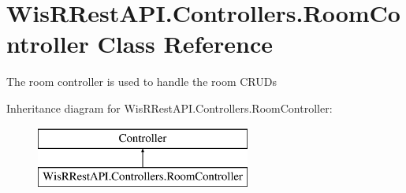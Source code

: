 \hypertarget{class_wis_r_rest_a_p_i_1_1_controllers_1_1_room_controller}{}\section{Wis\+R\+Rest\+A\+P\+I.\+Controllers.\+Room\+Controller Class Reference}
\label{class_wis_r_rest_a_p_i_1_1_controllers_1_1_room_controller}


The room controller is used to handle the room C\+R\+U\+D\textquotesingle{}s  


Inheritance diagram for Wis\+R\+Rest\+A\+P\+I.\+Controllers.\+Room\+Controller\+:\begin{figure}[H]
\begin{center}
\leavevmode
\includegraphics[height=2.000000cm]{class_wis_r_rest_a_p_i_1_1_controllers_1_1_room_controller}
\end{center}
\end{figure}
